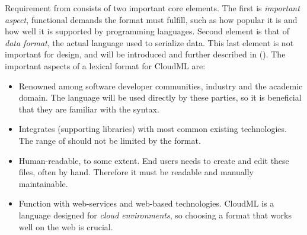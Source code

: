 Requirement  from  consists of two
important core elements.
The first is \emph{important aspect}, \ie functional demands the format must fulfill,
such as how popular it is and how well it is supported by programming languages.
Second element is that of \emph{data format}, \ie the actual language used to 
serialize data.
This last element is not important for design, and will be introduced and
further described in  ().
The important aspects of a lexical format for CloudML are:
\begin{itemize}
  \item Renowned among software developer communities, industry and the academic domain.
    The language will be used directly by these parties, so it is beneficial
    that they are familiar with the syntax.
  \item Integrates (supporting libraries) with most common existing technologies.
    The range of  should not be limited by the format.
  \item Human-readable, to some extent.
    End users needs to create and edit these files, often by hand.
    Therefore it must be readable and manually maintainable.
  \item Function with web-services and web-based technologies.
    CloudML is a language designed for \emph{cloud environments},
    so choosing a format that works well on the web is crucial.
\end{itemize}
